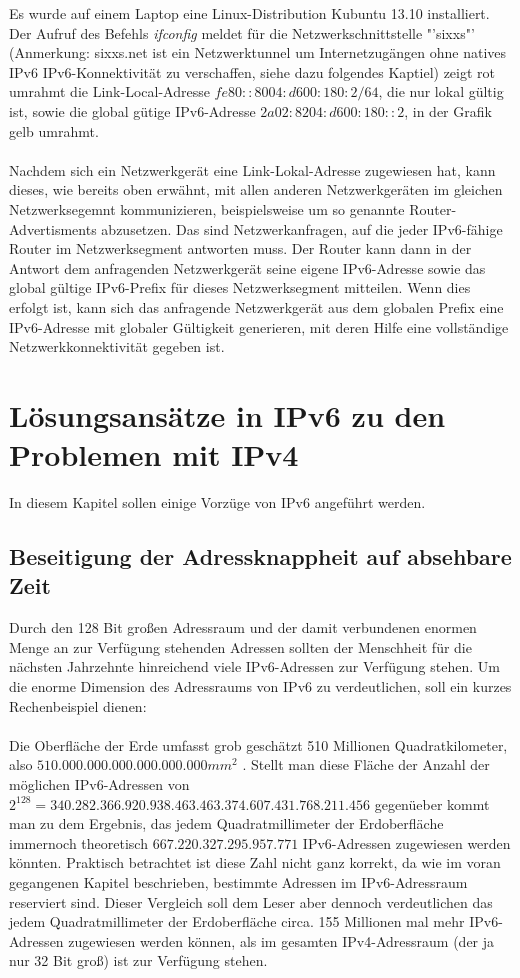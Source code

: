 \documentclass[a4paper,12pt]{scrartcl}
\begin{document}
Es wurde auf einem Laptop eine Linux-Distribution Kubuntu 13.10 installiert. Der Aufruf des Befehls \textit{ifconfig} meldet f\"ur die Netzwerkschnittstelle "'sixxs"' (Anmerkung: sixxs.net ist ein Netzwerktunnel um Internetzug\"angen ohne natives IPv6 IPv6-Konnektivit\"at zu verschaffen, siehe dazu folgendes Kaptiel) zeigt rot umrahmt die Link-Local-Adresse $fe80::8004:d600:180:2/64$, die nur lokal g\"ultig ist, sowie die global g\"utige IPv6-Adresse $2a02:8204:d600:180::2$, in der Grafik gelb umrahmt.\\
\\
Nachdem sich ein Netzwerkger\"at eine Link-Lokal-Adresse zugewiesen hat, kann dieses, wie bereits oben erw\"ahnt, mit allen anderen Netzwerkger\"aten im gleichen Netzwerksegemnt kommunizieren, beispielsweise um so genannte Router-Advertisments abzusetzen. Das sind Netzwerkanfragen, auf die jeder IPv6-f\"ahige Router im Netzwerksegment antworten muss. Der Router kann dann in der Antwort dem anfragenden Netzwerkger\"at seine eigene IPv6-Adresse sowie das global g\"ultige IPv6-Prefix f\"ur dieses Netzwerksegment mitteilen. Wenn dies erfolgt ist, kann sich das anfragende Netzwerkger\"at aus dem globalen Prefix eine IPv6-Adresse mit globaler G\"ultigkeit generieren, mit deren Hilfe eine vollst\"andige Netzwerkkonnektivit\"at gegeben ist. 


\clearpage
\section{L\"osungsans\"atze in IPv6 zu den Problemen mit IPv4}
In diesem Kapitel sollen einige Vorz\"uge von IPv6 angef\"uhrt werden.
 
\subsection{Beseitigung der Adressknappheit auf absehbare Zeit}
Durch den 128 Bit gro{\ss}en Adressraum und der damit verbundenen enormen Menge an zur Verf\"ugung stehenden Adressen sollten der Menschheit f\"ur die n\"achsten Jahrzehnte hinreichend viele IPv6-Adressen zur Verfügung stehen.  Um die enorme Dimension des Adressraums von IPv6 zu verdeutlichen, soll ein kurzes Rechenbeispiel dienen:\\
\\
Die Oberfläche der Erde umfasst grob geschätzt 510 Millionen Quadratkilometer, also $510.000.000.000.000.000.000 mm^2$ . Stellt man diese Fl\"ache der Anzahl der m\"oglichen IPv6-Adressen von $2^{128} = 340.282.366.920.938.463.463.374.607.431.768.211.456$ gegen\"ueber kommt man zu dem Ergebnis, das jedem Quadratmillimeter der Erdoberfl\"ache immernoch theoretisch $667.220.327.295.957.771 $ IPv6-Adressen zugewiesen werden k\"onnten. Praktisch betrachtet ist diese Zahl nicht ganz korrekt, da wie im voran gegangenen Kapitel beschrieben, bestimmte Adressen im IPv6-Adressraum reserviert sind. Dieser Vergleich soll dem Leser aber dennoch verdeutlichen das jedem Quadratmillimeter der Erdoberfl\"ache circa. 155 Millionen mal mehr IPv6-Adressen zugewiesen werden k\"onnen, als im gesamten IPv4-Adressraum (der ja nur 32 Bit gro{\ss}) ist zur Verf\"ugung stehen.
\end{document}

